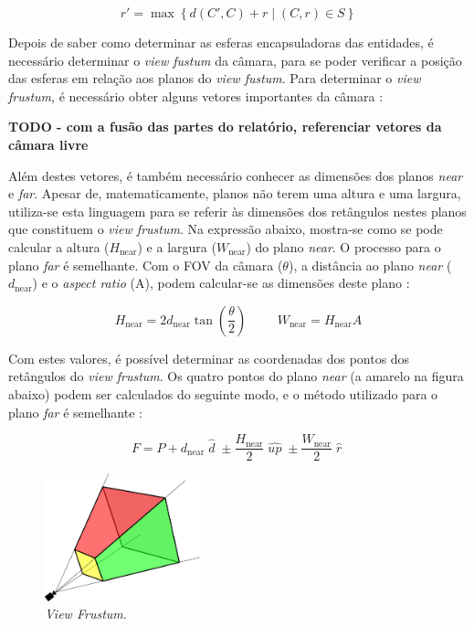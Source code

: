 \documentclass[12pt, a4paper]{article}
\begin{document}
$$
r' = \max \left \lbrace d(C', C) + r \mid (C, r) \in S \right \rbrace
$$

Depois de saber como determinar as esferas encapsuladoras das entidades, é necessário determinar
o \emph{view fustum} da câmara, para se poder verificar a posição das esferas em relação aos planos
do \emph{view fustum}. Para determinar o \emph{view frustum}, é necessário obter alguns vetores
importantes da câmara \cite{lighthouse3d-frustum-planes}:

\textbf{\color{red} TODO - com a fusão das partes do relatório, referenciar vetores da câmara livre}

Além destes vetores, é também necessário conhecer as dimensões dos planos \emph{near} e \emph{far}.
Apesar de, matematicamente, planos não terem uma altura e uma largura, utiliza-se esta linguagem
para se referir às dimensões dos retângulos nestes planos que constituem o \emph{view frustum}. Na
expressão abaixo, mostra-se como se pode calcular a altura ($H_\text{near}$) e a largura
($W_\text{near}$) do plano \emph{near}. O processo para o plano \emph{far} é semelhante. Com o FOV
da câmara ($\theta$), a distância ao plano \emph{near} ($d_\text{near}$) e o \emph{aspect ratio}
(A), podem calcular-se as dimensões deste plano \cite{lighthouse3d-frustum-distances}:

$$
H_\text{near} = 2 d_\text{near} \tan \left ( \frac{\theta}{2} \right )
\hspace{1cm}
W_\text{near} = H_\text{near} A
$$

Com estes valores, é possível determinar as coordenadas dos pontos dos retângulos do
\emph{view frustum}. Os quatro pontos do plano \emph{near} (a amarelo na figura abaixo) podem ser
calculados do seguinte modo, e o método utilizado para o plano \emph{far} é semelhante
\cite{lighthouse3d-frustum-planes}:

$$
F = P +
    d_\text{near} \; \widehat{d} \; \pm
    \frac{H_\text{near}}{2} \; \widehat{up} \; \pm
    \frac{W_\text{near}}{2} \; \widehat{r} \;
$$

\begin{figure}[H]
    \centering
    \includegraphics[width=0.4\textwidth]{res/phase2/ViewFrustum.pdf}
    \caption{\emph{View Frustum}.}
\end{figure}
\end{document}
